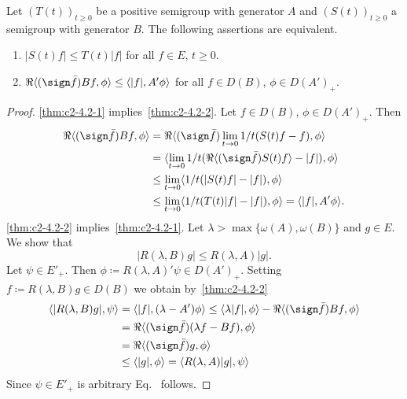 \begin{theorem}\label{thm:c2-4.2}
Let $(T(t))_{t \geq 0}$ be a positive semigroup with generator $A$ and $(S(t))_{t \geq 0}$ a semigroup with generator $B$. The following assertions are equivalent.
\begin{enumerate}[\upshape (a)]
\item \label{thm:c2-4.2-1}
$|S(t)f| \leq T(t)|f|$ for all $f \in E$, $t \geq 0$.
\item \label{thm:c2-4.2-2}
$\Re\langle(\sign  \bar{f}) Bf,\phi\rangle \leq \langle|f|,A'\phi\rangle$ for all $f \in D(B)$, $\phi \in D(A')_{+}$.
\end{enumerate}
\end{theorem}
\begin{proof}
\ref{thm:c2-4.2-1}   implies~\ref{thm:c2-4.2-2}. Let $f \in D(B)$, $\phi \in D(A')_{+}$. Then
\begin{align*}
\Re\langle(\sign  \bar{f})Bf, \phi\rangle &= 
\Re \langle(\sign  \bar{f})\lim_{t \to 0}1/t(S(t)f - f),\phi\rangle\\
&= \langle\lim_{t \to 0}1/t(\Re\langle(\sign  \bar{f}) S(t)f\rangle - |f|),\phi\rangle\\
&\leq \lim_{t \to 0}\langle 1/t(|S(t)f| - |f|),\phi\rangle\\
&\leq \lim_{t \to 0}\langle 1/t(T(t)|f| - |f|),\phi\rangle = \langle|f|,A'\phi\rangle.
\end{align*}
\ref{thm:c2-4.2-2}   implies~\ref{thm:c2-4.2-1}. 
Let $\lambda > \max\{\omega (A),\omega (B)\}$ and $g \in E$. 
We show that
\begin{equation}\label{eq:c2-4.3}
|R(\lambda,B)g| \leq R(\lambda,A)|g|.
\end{equation}
Let $\psi \in E'_{+}$. Then $\phi \coloneq R(\lambda,A)'\psi \in D(A')_{+}$.
Setting $f \coloneq R(\lambda,B)g \in D(B)$ we obtain by~\ref{thm:c2-4.2-2}  
\begin{align*}
\langle|R(\lambda,B)g|,\psi\rangle &= \langle|f|,(\lambda-A')\phi\rangle \leq \langle\lambda|f|,\phi\rangle - \Re\langle(\sign  \bar{f})Bf,\phi\rangle\\
&= \Re\langle(\sign  \bar{f})(\lambda f - Bf),\phi\rangle \\
&= \Re\langle(\sign  \bar{f})g,\phi\rangle \\
&\leq \langle|g|,\phi\rangle = \langle R(\lambda,A)|g|,\psi\rangle
\end{align*}
Since $\psi \in E'_{+}$ is arbitrary Eq.~ follows.
\end{proof}

